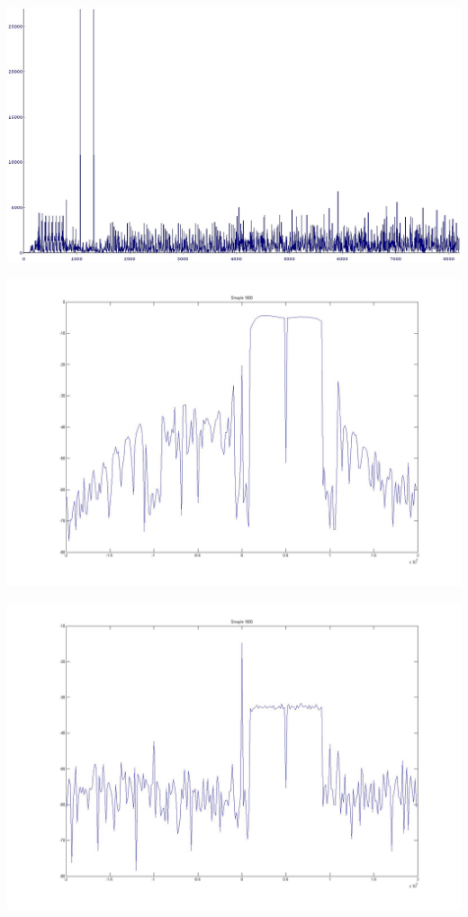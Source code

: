 \begin{center}
\includegraphics[width=\textwidth]{content/fig/crosscorr.JPG}
\label{crosscorr}
\end{center}


\begin{center}
\includegraphics[width=\textwidth]{content/fig/baseIFAdcDac.JPG}
\label{baseIFAdcDac}
\end{center}

\begin{center}
\includegraphics[width=\textwidth]{content/fig/RfIF.JPG}
\label{RfIF}
\end{center}

